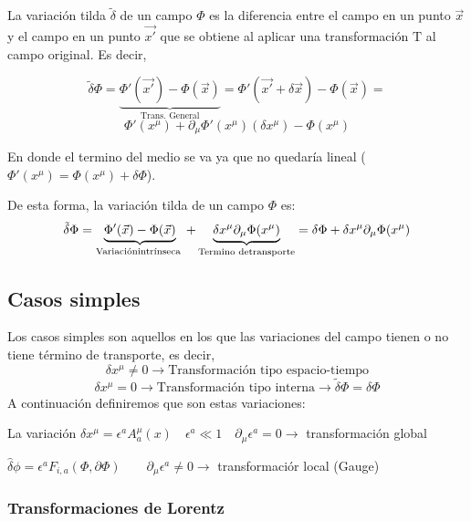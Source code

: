 \begin{definition}
  La variación tilda $\tilde{\delta}$ de un campo $\Phi$ es la diferencia entre el campo en un punto $\vec{x}$ y el campo en un punto $\vec{x'}$ que se obtiene al aplicar una transformación $\text{T}$ al campo original. Es decir,
  
  \[\tilde{\delta}\Phi=\underbrace{\Phi'(\vec{x'})-\Phi(\vec{x})}_{\text{Trans. General}}=\Phi'(\vec{x'}+\delta\vec{x})-\Phi(\vec{x})=\]
  \[\Phi'(x^{\mu})+\partial_{\mu}\Phi'(x^{\mu})(\delta x^{\mu})-\Phi(x^{\mu})\]

  En donde el termino del medio se va ya que no quedaría lineal ($\Phi'(x^{\mu})=\Phi(x^{\mu})+\delta \Phi$). 

  De esta forma, la variación tilda de un campo $\Phi$ es:
  \[\tilde{\delta}\Phi=\underbrace{\Phi'(\vec{x})-\Phi(\vec{x})}_{\text{Variación \\ intrínseca }}+\underbrace{\delta x^{\mu}\partial_{\mu}\Phi(x^{\mu})}_{\text{Termino de \\ transporte}}=\delta\Phi+\delta x^{\mu}\partial_{\mu}\Phi(x^{\mu})\]
  
\end{definition}

\subsection{Casos simples}
Los casos simples son aquellos en los que las variaciones del campo tienen o no tiene término de transporte, es decir, 
\[\delta x^{\mu}\neq 0 \longrightarrow\text{Transformación tipo espacio-tiempo}\]
\[\delta x^{\mu}= 0 \longrightarrow\text{Transformación tipo interna} \rightarrow \tilde{\delta}\Phi=\delta\Phi\]
A continuación definiremos que son estas variaciones:
\begin{definition}
  La variación 
  $\delta x^\mu=\epsilon^a A_a^\mu(x) \quad \epsilon^a \ll 1 \quad \partial_\mu \epsilon^a=0 \rightarrow$ transformación global

\end{definition}
\begin{definition}
  $\hat{\delta} \phi=\epsilon^a F_{i, a}(\Phi, \partial \Phi) \quad \quad \partial_\mu \epsilon^a \neq 0 \rightarrow$ transformaciór local (Gauge)
\end{definition}
\subsubsection{Transformaciones de Lorentz}

